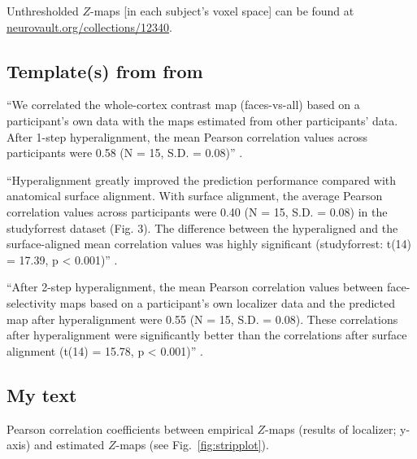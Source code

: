 
Unthresholded $Z$-maps [in each subject's voxel space] can be found at
\href{https://identifiers.org/neurovault.collection:12340}{\url{neurovault.org/collections/12340}}.


\subsection{Template(s) from from \citet{jiahui2020predicting}}

``We correlated the whole-cortex contrast map (faces-vs-all) based on a
participant's own data with the maps estimated from other participants' data.
%
After 1-step hyperalignment, the mean Pearson correlation values across
participants were 0.58 (N = 15, S.D. = 0.08)'' \citep{jiahui2020predicting}.

%
``Hyperalignment greatly improved the prediction performance compared with
anatomical surface alignment.
%
With surface alignment, the average Pearson correlation values across
participants were 0.40 (N = 15, S.D. = 0.08) in the studyforrest dataset (Fig.
3).
%
The difference between the hyperaligned and the surface-aligned mean correlation
values was highly significant (studyforrest: t(14) = 17.39, p < 0.001)''
\citep{jiahui2020predicting}.

%
``After 2-step hyperalignment, the mean Pearson correlation values between
face-selectivity maps based on a participant's own localizer data and the
predicted map after hyperalignment were 0.55 (N = 15, S.D. = 0.08).
%
These correlations after hyperalignment were significantly better than the
correlations after surface alignment (t(14) = 15.78, p < 0.001)''
\citep{jiahui2020predicting}.


\subsection{My text}



%
Pearson correlation coefficients between empirical $Z$-maps (results of
localizer; y-axis) and estimated $Z$-maps (see Fig.~\ref{fig:stripplot}).



